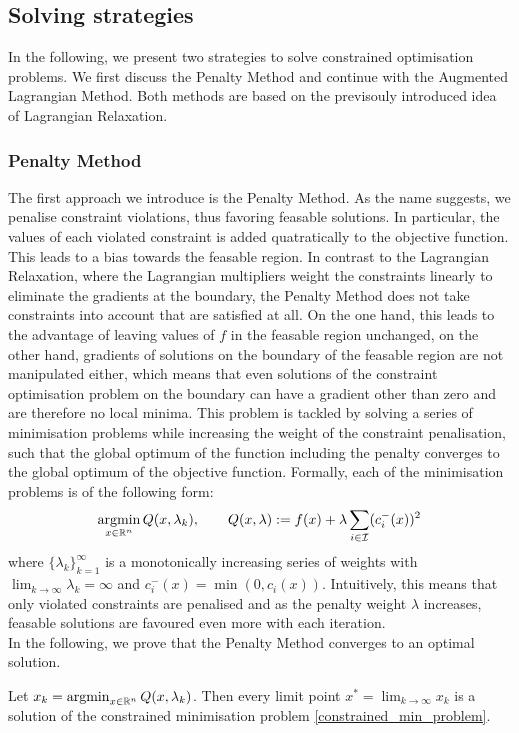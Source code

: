 \subsection{Solving strategies}
In the following, we present two strategies to solve constrained optimisation problems. We first discuss the Penalty Method and continue with the Augmented Lagrangian Method. Both methods are based on the previsouly introduced idea of Lagrangian Relaxation.
\subsubsection{Penalty Method}
The first approach we introduce is the Penalty Method. As the name suggests, we penalise constraint violations, thus favoring feasable solutions. In particular, the values of each violated constraint is added quatratically to the objective function. This leads to a bias towards the feasable region. In contrast to the Lagrangian Relaxation, where the Lagrangian multipliers weight the constraints linearly to eliminate the gradients at the boundary, the Penalty Method does not take constraints into account that are satisfied at all. On the one hand, this leads to the advantage of leaving values of $f$ in the feasable region unchanged, on the other hand, gradients of solutions on the boundary of the feasable region are not manipulated either, which means that even solutions of the constraint optimisation problem on the boundary can have a gradient other than zero and are therefore no local minima. This problem is tackled by solving a series of minimisation problems while increasing the weight of the constraint penalisation, such that the global optimum of the function including the penalty converges to the global optimum of the objective function. Formally, each of the minimisation problems is of the following form:
\[\operatorname*{argmin}_{x \in \mathbb{R}^n} Q(x, \lambda_k), \qquad Q(x, \lambda) := f(x) + \lambda \sum_{i \in \mathcal{I}} (c_i^{-}(x))^2\]
where $\{\lambda_k\}_{k=1}^\infty$ is a monotonically increasing series of weights with $\lim_{k \to \infty} \lambda_k = \infty$ and $c_i^-(x) = \min(0, c_i(x))$. Intuitively, this means that only violated constraints are penalised and as the penalty weight $\lambda$ increases, feasable solutions are favoured even more with each iteration.\\
In the following, we prove that the Penalty Method converges to an optimal solution.
\begin{theorem}
	Let $x_k = \operatorname*{argmin}_{x \in \mathbb{R}^n} Q(x, \lambda_k)$. Then every limit point $x^* = \lim_{k \to \infty} x_k$ is a solution of the constrained minimisation problem \eqref{constrained_min_problem}.
\end{theorem}
